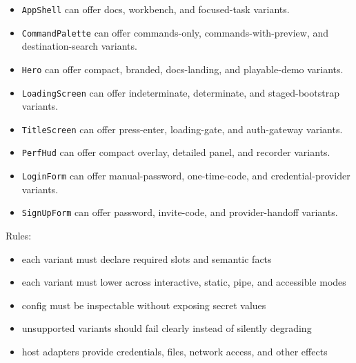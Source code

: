 \begin{itemize}
\tightlist
\item
  \texttt{A\allowbreak{}p\allowbreak{}p\allowbreak{}S\allowbreak{}h\allowbreak{}e\allowbreak{}l\allowbreak{}l} can offer docs, workbench, and focused-task variants.
\item
  \texttt{C\allowbreak{}o\allowbreak{}m\allowbreak{}m\allowbreak{}a\allowbreak{}n\allowbreak{}d\allowbreak{}P\allowbreak{}a\allowbreak{}l\allowbreak{}e\allowbreak{}t\allowbreak{}t\allowbreak{}e} can offer commands-only, commands-with-preview, and destination-search variants.
\item
  \texttt{H\allowbreak{}e\allowbreak{}r\allowbreak{}o} can offer compact, branded, docs-landing, and playable-demo variants.
\item
  \texttt{L\allowbreak{}o\allowbreak{}a\allowbreak{}d\allowbreak{}i\allowbreak{}n\allowbreak{}g\allowbreak{}S\allowbreak{}c\allowbreak{}r\allowbreak{}e\allowbreak{}e\allowbreak{}n} can offer indeterminate, determinate, and staged-bootstrap variants.
\item
  \texttt{T\allowbreak{}i\allowbreak{}t\allowbreak{}l\allowbreak{}e\allowbreak{}S\allowbreak{}c\allowbreak{}r\allowbreak{}e\allowbreak{}e\allowbreak{}n} can offer press-enter, loading-gate, and auth-gateway variants.
\item
  \texttt{P\allowbreak{}e\allowbreak{}r\allowbreak{}f\allowbreak{}H\allowbreak{}u\allowbreak{}d} can offer compact overlay, detailed panel, and recorder variants.
\item
  \texttt{L\allowbreak{}o\allowbreak{}g\allowbreak{}i\allowbreak{}n\allowbreak{}F\allowbreak{}o\allowbreak{}r\allowbreak{}m} can offer manual-password, one-time-code, and credential-provider variants.
\item
  \texttt{S\allowbreak{}i\allowbreak{}g\allowbreak{}n\allowbreak{}U\allowbreak{}p\allowbreak{}F\allowbreak{}o\allowbreak{}r\allowbreak{}m} can offer password, invite-code, and provider-handoff variants.
\end{itemize}

Rules:

\begin{itemize}
\tightlist
\item
  each variant must declare required slots and semantic facts
\item
  each variant must lower across interactive, static, pipe, and accessible modes
\item
  config must be inspectable without exposing secret values
\item
  unsupported variants should fail clearly instead of silently degrading
\item
  host adapters provide credentials, files, network access, and other effects
\end{itemize}

